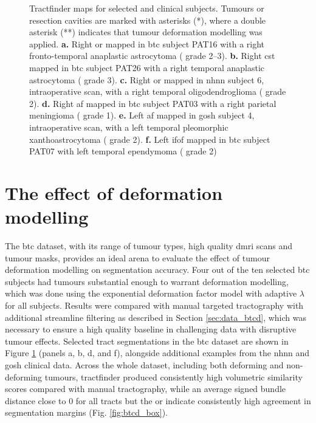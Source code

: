 \begin{figure}
  
  \caption[Example tractfinder results in tumour patients]{Tractfinder maps for selected  and clinical subjects. Tumours or resection cavities are marked with asterisks (*), where a double asterisk (**) indicates that tumour deformation modelling was applied.
  \textbf{\sffamily a.} Right \gls{or} mapped in \gls{btc} subject PAT16 with a right fronto-temporal anaplastic astrocytoma ( grade 2--3).
  \textbf{\sffamily b.} Right \gls{cst} mapped in \gls{btc} subject PAT26 with a right temporal anaplastic astrocytoma ( grade 3).
  \textbf{\sffamily c.} Right \gls{or} mapped in \gls{nhnn} subject 6, intraoperative scan, with a right temporal oligodendroglioma ( grade 2).
  \textbf{\sffamily d.} Right \gls{af} mapped in \gls{btc} subject PAT03 with a right parietal meningioma ( grade 1).
  \textbf{\sffamily e.} Left \gls{af} mapped in \gls{gosh} subject 4, intraoperative scan, with a left temporal pleomorphic xanthoastrocytoma ( grade 2).
  \textbf{\sffamily f.} Left \gls{ifof} mapped in \gls{btc} subject PAT07 with left temporal ependymoma ( grade 2)}
  \label{fig:tumours}
\end{figure}

\section{The effect of deformation modelling}
\label{sec:btcd}

The \gls{btc} dataset, with its range of tumour types, high quality \gls{dmri} scans and tumour masks, provides an ideal arena to evaluate the effect of tumour deformation modelling on segmentation accuracy.
Four out of the ten selected \gls{btc} subjects had tumours substantial enough to warrant deformation modelling, which was done using the exponential deformation factor model with adaptive $\lambda$ for all subjects.
Results were compared with manual targeted tractography with additional streamline filtering as described in Section \ref{sec:data_btcd}, which was necessary to ensure a high quality baseline in challenging data with disruptive tumour effects.
Selected tract segmentations in the \gls{btc} dataset are shown in Figure \ref{fig:tumours} (panels a, b, d, and f), alongside additional examples from the \gls{nhnn} and \gls{gosh} clinical data.
Across the whole dataset, including both deforming and non-deforming tumours, tractfinder produced consistently high volumetric similarity scores compared with manual tractography, while an average signed bundle distance close to 0 for all tracts but the \gls{or} indicate consistently high agreement in segmentation margins (Fig. \ref{fig:btcd_box}).

